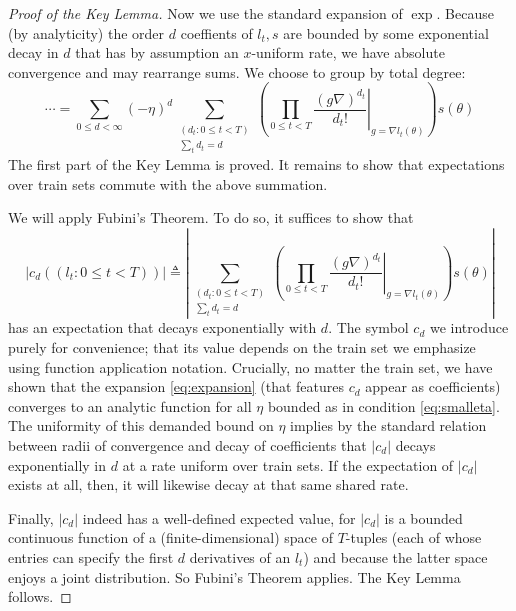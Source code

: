 \documentclass[openany, notitlepage, justified]{tufte-book}
\theoremstyle{plain}
\theoremstyle{definition}
\newcommand{\wrap}[1]{\left(#1\right)}
\newcommand{\wabs}[1]{\left|#1\right|}
\begin{document}
\begin{proof}[Proof of the Key Lemma]
            Now we use the standard expansion of $\exp$.  Because (by
            analyticity) the order $d$ coeffients of $l_t, s$ are bounded by
            some exponential decay in $d$ that has by assumption an $x$-uniform
            rate, we have absolute convergence and may rearrange sums.  We
            choose to group by total degree:
            \begin{equation} \label{eq:expansion}
                \cdots 
                =
                \sum_{0\leq d < \infty} (-\eta)^d
                \sum_{\substack{(d_t: 0\leq t<T) \\ \sum_t d_t = d}}
                \wrap{
                    \prod_{0 \leq t < T} \left.
                        \frac{(g \nabla)^{d_t}}{d_t!}
                    \right|_{g=\nabla l_t(\theta)}
                } s (\theta)
            \end{equation}
            The first part of the Key Lemma is proved.  It remains to show that
            expectations over train sets commute with the above summation.

            We will apply Fubini's Theorem.  To do so, it suffices to show that   
            $$
                \wabs{c_d((l_t: 0\leq t<T))} 
                \triangleq
                \wabs{
                    \sum_{\substack{(d_t: 0\leq t<T) \\ \sum_t d_t = d}}
                    \wrap{
                        \prod_{0 \leq t < T} \left.
                            \frac{(g \nabla)^{d_t}}{d_t!}
                        \right|_{g=\nabla l_t(\theta)}
                    } s (\theta)
                }
            $$
            has an expectation that decays exponentially with $d$.  The symbol
            $c_d$ we introduce purely for convenience; that its value depends
            on the train set we emphasize using function application
            notation.  Crucially, no matter the train set, we have shown
            that the expansion \ref{eq:expansion} (that features $c_d$ appear
            as coefficients) converges to an analytic function for all $\eta$
            bounded as in condition \ref{eq:smalleta}.  The uniformity of this
            demanded bound on $\eta$ implies by the standard relation between
            radii of convergence and decay of coefficients that $\wabs{c_d}$
            decays exponentially in $d$ at a rate uniform over train sets.
            If the expectation of $\wabs{c_d}$ exists at all, then, it will
            likewise decay at that same shared rate.
            
            Finally, $\wabs{c_d}$ indeed has a well-defined expected value, for
            $\wabs{c_d}$ is a bounded continuous function of a
            (finite-dimensional) space of $T$-tuples (each of whose entries can
            specify the first $d$ derivatives of an $l_t$) and because the
            latter space enjoys a joint distribution.  So Fubini's Theorem
            applies.  The Key Lemma follows.   
        \end{proof}
\end{document}
